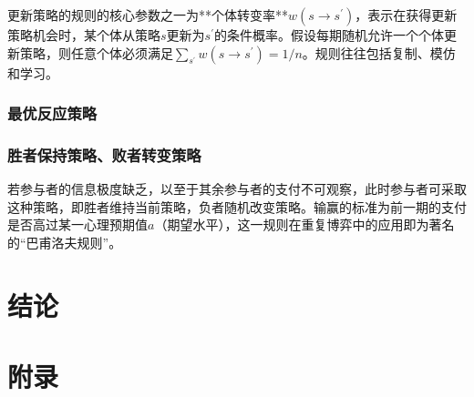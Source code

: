 \documentclass[lang=cn,12pt,a4paper]{elegantpaper}
\begin{document}
更新策略的规则的核心参数之一为**个体转变率**$w(s\rightarrow s^\prime)$，表示在获得更新策略机会时，某个体从策略$s$更新为$s^\prime$的条件概率。假设每期随机允许一个个体更新策略，则任意个体必须满足$\sum_{s^\prime} w(s\rightarrow s^\prime)=1/n$。规则往往包括复制、模仿和学习。

\subsubsection{最优反应策略}

\subsubsection{胜者保持策略、败者转变策略}

若参与者的信息极度缺乏，以至于其余参与者的支付不可观察，此时参与者可采取这种策略，即胜者维持当前策略，负者随机改变策略。输赢的标准为前一期的支付是否高过某一心理预期值$a$（期望水平），这一规则在重复博弈中的应用即为著名的“巴甫洛夫规则”。






\section{结论}

\section{附录}






\nocite{*}


\end{document}
